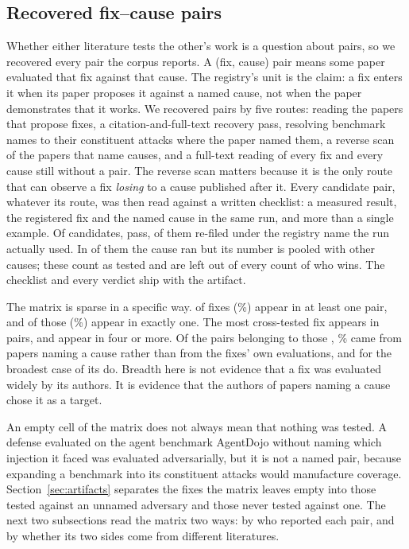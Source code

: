 \subsection{Recovered fix--cause pairs}
\label{sec:coverage}

Whether either literature tests the other's work is a question about pairs,
so we recovered every pair the corpus reports. A (fix, cause) pair means some paper evaluated that fix against
that cause. The registry's unit is the claim: a fix enters it when its
paper proposes it against a named cause, not when the paper demonstrates
that it works. We recovered pairs by five routes: reading the papers that propose fixes, a
citation-and-full-text recovery pass, resolving benchmark names to their
constituent attacks where the paper named them, a reverse scan of the
papers that name causes, and a full-text reading of every fix and every
cause still without a pair. The reverse scan matters because it is the only
route that can observe a fix \emph{losing} to a cause published after it.
Every candidate pair, whatever its route, was then read against a written
checklist: a measured result, the registered fix and the named cause in the
same run, and more than a single example. Of \NPairCandidates{} candidates,
\NPairsComposite{} pass, \NPairsRefiled{} of them re-filed under the registry
name the run actually used. In \NPairsPooled{} of them the cause ran but its
number is pooled with other causes; these count as tested and are left out of
every count of who wins. The checklist and every verdict ship with the
artifact.

The matrix is sparse in a specific way. \NDefMatchedFull{} of \NFixes{}
fixes (\PctDefMatched{}\%) appear in at least one pair, and \NDefOneFull{} of
those (\PctDefOneFull{}\%) appear in exactly one. The most cross-tested fix
appears in \NDefCeiling{} pairs, and \NDefFourPlus{} appear in four or more.
Of the pairs belonging to those \NDefFourPlus{}, \PctBreadthFromAttack{}\%
came from papers naming a cause rather than from the fixes' own
evaluations, and for the broadest case \NBroadestFromAttack{} of its
\NBroadestPairs{} do. Breadth here is not evidence that a fix was evaluated
widely by its authors. It is evidence that the authors of papers naming a cause chose it
as a target.

An empty cell of the matrix does not always mean that nothing was tested. A
defense evaluated on the agent benchmark AgentDojo without naming which injection it faced was
evaluated adversarially, but it is not a named pair, because expanding a
benchmark into its constituent attacks would manufacture coverage.
Section~\ref{sec:artifacts} separates the fixes the matrix leaves empty into
those tested against an unnamed adversary and those never tested against one. The next two subsections read the matrix two ways: by who reported each pair,
and by whether its two sides come from different literatures.

